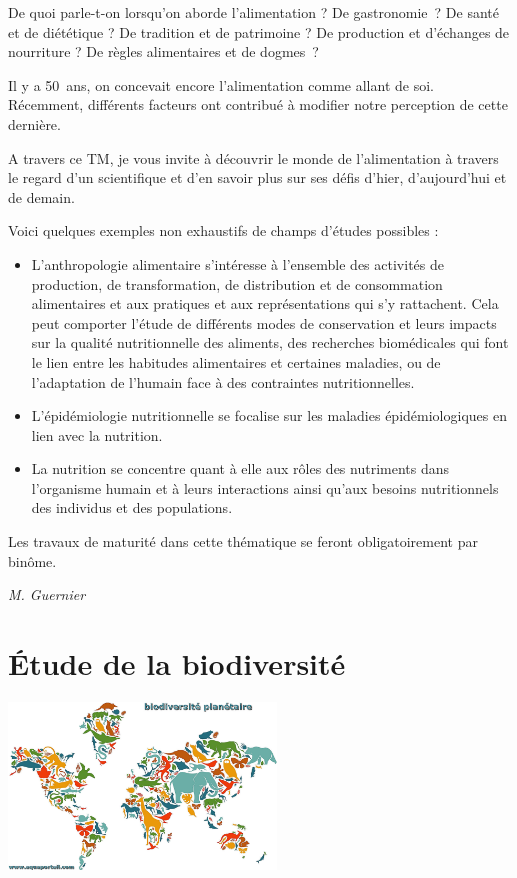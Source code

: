 \documentclass[
  10pt,
  french,
  a5paper,
  openany]{book}
\providecommand{\tightlist}{%
  \setlength{\itemsep}{0pt}\setlength{\parskip}{0pt}}
\newenvironment{signature}{\begin{flushright}}{\end{flushright}}
\begin{document}
De quoi parle-t-on lorsqu'on aborde l'alimentation ? De gastronomie~? De santé et de diététique ? De tradition et de patrimoine ? De production et d'échanges de nourriture ? De règles alimentaires et de dogmes~?

Il y a 50~ans, on concevait encore l'alimentation comme allant de soi. Récemment, différents facteurs ont contribué à modifier notre perception de cette dernière.

A travers ce TM, je vous invite à découvrir le monde de l'alimentation à travers le regard d'un scientifique et d'en savoir plus sur ses défis d'hier, d'aujourd'hui et de demain. ~

Voici quelques exemples non exhaustifs de champs d'études possibles :

\begin{itemize}
\tightlist
\item
  L'anthropologie alimentaire s'intéresse à l'ensemble des activités de production, de transformation, de distribution et de consommation alimentaires et aux pratiques et aux représentations qui s'y rattachent. Cela peut comporter l'étude de différents modes de conservation et leurs impacts sur la qualité nutritionnelle des aliments, des recherches biomédicales qui font le lien entre les habitudes alimentaires et certaines maladies, ou de l'adaptation de l'humain face à des contraintes nutritionnelles.
\item
  L'épidémiologie nutritionnelle se focalise sur les maladies épidémiologiques en lien avec la nutrition.
\item
  La nutrition se concentre quant à elle aux rôles des nutriments dans l'organisme humain et à leurs interactions ainsi qu'aux besoins nutritionnels des individus et des populations.
\end{itemize}

Les travaux de maturité dans cette thématique se feront obligatoirement par binôme.

\begin{signature}
\emph{M. Guernier}

\end{signature}

\hypertarget{uxe9tude-de-la-biodiversituxe9}{%
\chapter{Étude de la biodiversité}\label{uxe9tude-de-la-biodiversituxe9}}

\begin{center}
\includegraphics[width=\textwidth,height=12em]{images/etude-de-la-biodiversite.png}

\end{center}
\end{document}
